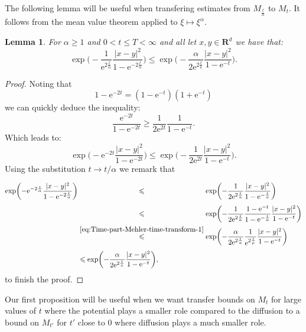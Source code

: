 \documentclass[a4paper,oneside,10pt]{amsproc}
\newtheorem{lemma}{Lemma}
\theoremstyle{remark}
\renewcommand{\leq}{\leqslant}
\renewcommand{\leq}{\leqslant}
\renewcommand{\geq}{\geqslant}
\newcommand{\R}{\mathbf R}
\newcommand{\e}{\mathrm{e}} %
\renewcommand{\leq}{\leqslant}%
\renewcommand{\geq}{\geqslant}%
\begin{document}
The following lemma will be useful when transfering estimates from
$M_{\frac{t}{\alpha}}$ to $M_t$. It follows from the mean value
theorem applied to $\xi \mapsto \xi^\alpha$.
\begin{lemma}\label{lem:Exponential-estimates}
  For $\alpha \geq 1$ and $0 < t \leq T < \infty$ and all let $x, y \in \R^d$
  we have that:
  \begin{equation}
    \label{eq:Exponential-estimates-1}
    \exp \biggl (-\frac1{\e^{2\frac{t}\alpha}} \frac{|x - y|^2}{1 - \e^{-2\frac{t}\alpha}}
    \biggr ) \leq \exp \biggl(-\frac{\alpha}{2\e^{2\frac{t}\kappa}} \frac{|x -
      y|^2}{1 - \e^{-t}} \biggr).
  \end{equation}
\end{lemma}
\begin{proof}
  Noting that
  \begin{equation*}
    1 - \e^{-2t} = (1 - \e^{-t})(1 + \e^{-t})
  \end{equation*}
  we can quickly deduce the inequality:
  \begin{equation*}
     \frac{\e^{-2t}}{1 - \e^{-2t}} \geq \frac1{2 \e^{2t}} \frac{1}{1 - \e^{-t}}.
  \end{equation*}
  Which leads to:
  \begin{equation*}
    \exp\biggl(-\e^{-2t} \dfrac{|x - y|^2}{1 - \e^{-2 t}} \biggr)
    \leq \exp\biggl(-\frac1{2\e^{2t}} \dfrac{|x - y|^2}{1 - \e^{-t}} \biggr).
  \end{equation*}
  Using the substitution $t \to t/\alpha$ we remark that 
  \begin{align*}
    \exp\biggl(-\e^{-2 \frac{t}{\alpha}} \frac{|x - y|^2}{1 - \e^{-2 \frac{t}{\alpha}}} \biggr)
    &\overset{\phantom{\eqref{eq:Time-part-Mehler-time-transform-1}}}{\leq} \exp\biggl(-\frac1{2\e^{2\frac{t}{\alpha}}} \frac{|x - y|^2}{1 -
      \e^{-\frac{t}{\alpha}}} \biggr)\\
    &\overset{\phantom{\eqref{eq:Time-part-Mehler-time-transform-1}}}{\leq}
    \exp\biggl(-\frac1{2\e^{2\frac{t}{\alpha}}} \frac{1 - \e^{-t}}{1 - \e^{-\frac{t}{\alpha}}}
    \frac{|x - y|^2}{1 - \e^{-t}} \biggr)\\
    &\overset{\eqref{eq:Time-part-Mehler-time-transform-1}}{\leq}
    \exp\biggl(-\frac\alpha{2\e^{2\frac{t}{\alpha}}} \frac1{\e^{2
        \frac{t}{\mu}}} \frac{|x - y|^2}{1 - \e^{-t}} \biggr)\\
    &\overset{\vphantom{\eqref{eq:Time-part-Mehler-time-transform-1}}}{\leq}
    \exp\biggl(-\frac\alpha{2\e^{2\frac{t}{\kappa}}} \frac{|x - y|^2}{1 -
      \e^{-t}} \biggr),
  \end{align*}
  to finish the proof.
\end{proof}
Our first proposition will be useful when we want transfer bounds on $M_t$
for large values of $t$ where the potential plays a smaller role compared to
the diffusion to a bound on $M_{t'}$ for $t'$ close to $0$ where diffusion
plays a much smaller role.
\end{document}
